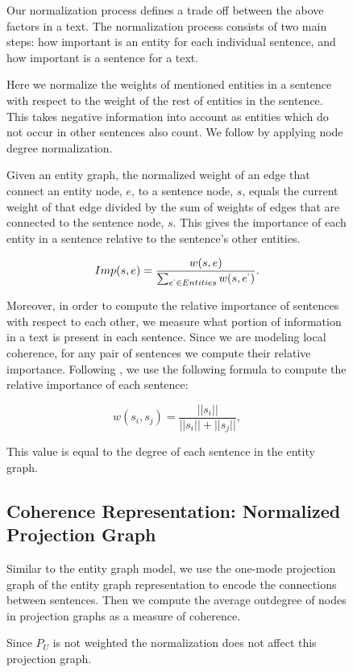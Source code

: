 \begin{figure}[!t]
Our normalization process defines a trade off between the above factors in a text.  
The normalization process consists of two main steps: how important is an entity for each individual sentence, and how important is a sentence for a text. 


Here we normalize the weights of mentioned entities in a sentence with respect to the weight of the rest of entities in the sentence. 
This takes negative information into account as entities which do not occur in other sentences also count. 
We follow  by applying node degree normalization. 

Given an entity graph, the normalized weight of an edge that connect an entity node, $e$, to a sentence node, $s$, equals the current weight of that edge divided by the sum of weights of edges that are connected to the sentence node, $s$. 
This gives the importance of each entity in a sentence relative to the sentence’s other entities.

\begin{equation}
Imp(s,e) = \frac{w(s,e)}{\sum_{e^{`}\in Entities}{w(s,e^{`})}}.
\end{equation} 

Moreover, in order to compute the relative importance of sentences with respect to each other, we measure what portion of information in a text is present in each sentence. 
Since we are modeling local coherence, for any pair of sentences we compute their relative importance. 
Following \cite{rode08}, we use the following formula to compute the relative importance of each sentence:

\begin{equation}
w(s_i, s_j) = \frac{||s_i||}{||s_i|| + ||s_j ||},
\end{equation}

This value is equal to the degree of each sentence in the entity graph.  

\subsection{Coherence Representation: Normalized Projection Graph}
%
Similar to the entity graph model, we use the one-mode projection graph of the entity graph representation to encode the connections between sentences. 
Then we compute the average outdegree of nodes in projection graphs as a measure of coherence. 

Since $P_U$ is not weighted the normalization does not affect this projection graph. 


\end{figure}
